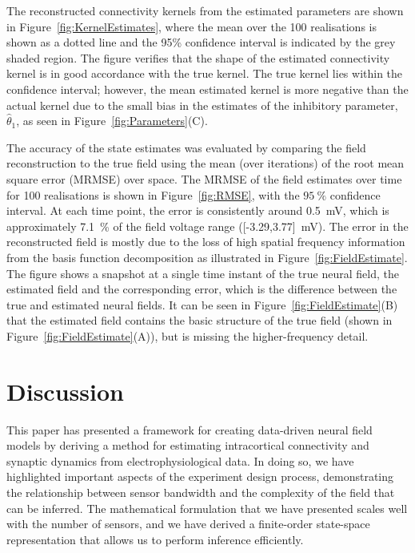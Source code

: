 \documentclass[10pt]{article}
\begin{document}
The reconstructed connectivity kernels from the estimated parameters are shown in Figure~\ref{fig:KernelEstimates}, where the mean over the 100 realisations is shown as a dotted line and the 95\% confidence interval is indicated by the grey shaded region. The figure verifies that the shape of the estimated connectivity kernel is in good accordance with the true kernel. The true kernel lies within the confidence interval; however, the mean estimated kernel is more negative than the actual kernel due to the small bias in the estimates of the inhibitory parameter, $\hat\theta_1$, as seen in Figure~\ref{fig:Parameters}(C).

The accuracy of the state estimates was evaluated by comparing the field reconstruction to the true field using the mean (over iterations) of the root mean square error (MRMSE) over space. The MRMSE of the field estimates over time for 100 realisations is shown in Figure~\ref{fig:RMSE}, with the $95~\%$ confidence interval. At each time point, the error is consistently around 0.5~mV, which is approximately 7.1~\% of the field voltage range ([-3.29,3.77]~mV). The error in the reconstructed field is mostly due to the loss of high spatial frequency information from the basis function decomposition as illustrated in Figure~\ref{fig:FieldEstimate}. The figure shows a snapshot at a single time instant of the true neural field, the estimated field and the corresponding error, which is the difference between the true and estimated neural fields. It can be seen in Figure~\ref{fig:FieldEstimate}(B) that the estimated field contains the basic structure of the true field (shown in Figure~\ref{fig:FieldEstimate}(A)), but is missing the higher-frequency detail.

\section*{Discussion}\label{DiscussionSection}
This paper has presented a framework for creating data-driven neural field models by deriving a method for estimating intracortical connectivity and synaptic dynamics from electrophysiological data. In doing so, we have highlighted important aspects of the experiment design process, demonstrating the relationship between sensor bandwidth and the complexity of the field that can be inferred. The mathematical formulation that we have presented scales well with the number of sensors, and we have derived a finite-order state-space representation that allows us to perform inference efficiently. 
\end{document}
